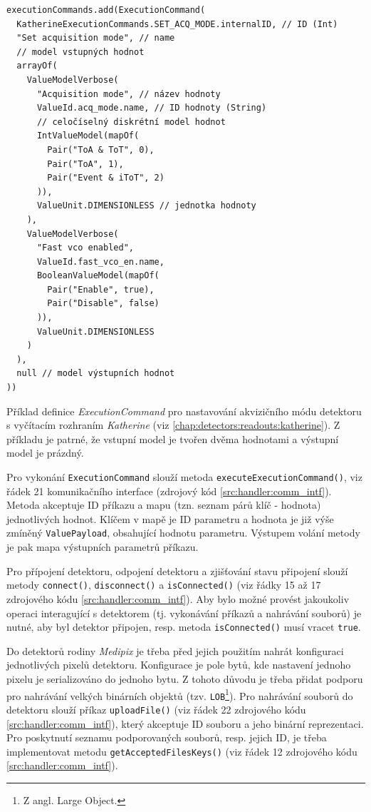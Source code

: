 \begin{verbatim}
executionCommands.add(ExecutionCommand(
  KatherineExecutionCommands.SET_ACQ_MODE.internalID, // ID (Int)
  "Set acquisition mode", // name
  // model vstupných hodnot
  arrayOf(
    ValueModelVerbose(
      "Acquisition mode", // název hodnoty
      ValueId.acq_mode.name, // ID hodnoty (String)
	  // celočíselný diskrétní model hodnot
	  IntValueModel(mapOf(
        Pair("ToA & ToT", 0),
        Pair("ToA", 1),
        Pair("Event & iToT", 2)
      )),
      ValueUnit.DIMENSIONLESS // jednotka hodnoty
    ), 
    ValueModelVerbose(
      "Fast vco enabled",
      ValueId.fast_vco_en.name,
      BooleanValueModel(mapOf(
        Pair("Enable", true),
        Pair("Disable", false)
      )),
      ValueUnit.DIMENSIONLESS
	)
  ),
  null // model výstupních hodnot
))
\end{verbatim}
\begin{code}[h!]
\caption{Příklad definice \textit{ExecutionCommand} pro nastavování akvizičního módu detektoru s vyčítacím rozhraním \textit{Katherine} (viz \ref{chap:detectors:readouts:katherine}). Z příkladu je patrné, že vstupní model je tvořen dvěma hodnotami a výstupní model je prázdný.}
\label{src:handler:execution_command}
\end{code}

Pro vykonání \texttt{ExecutionCommand} slouží metoda \texttt{executeExecutionCommand()}, viz řádek 21 komunikačního interface (zdrojový kód \ref{src:handler:comm_intf}). Metoda akceptuje ID příkazu a mapu (tzn. seznam párů klíč - hodnota) jednotlivých hodnot. Klíčem v mapě je ID parametru a hodnota je již výše zmíněný \texttt{ValuePayload}, obsahující hodnotu parametru. Výstupem volání metody je pak mapa výstupních parametrů příkazu.

Pro přípojení detektoru, odpojení detektoru a zjišťování stavu připojení slouží metody \texttt{connect()}, \texttt{disconnect()} a \texttt{isConnected()} (viz řádky 15 až 17 zdrojového kódu \ref{src:handler:comm_intf}). Aby bylo možné provést jakoukoliv operaci interagující s detektorem (tj. vykonávání příkazů a nahrávání souborů) je nutné, aby byl detektor připojen, resp. metoda \texttt{isConnected()} musí vracet \texttt{true}.

Do detektorů rodiny \textit{Medipix} je třeba před jejich použitím nahrát konfiguraci jednotlivých pixelů detektoru. Konfigurace je pole bytů, kde nastavení jednoho pixelu je serializováno do jednoho bytu. Z tohoto důvodu je třeba přidat podporu pro nahrávání velkých binárních objektů (tzv. \texttt{LOB}\footnote{Z angl. Large Object.}).
Pro nahrávání souborů do detektoru slouží příkaz \texttt{uploadFile()} (viz řádek 22 zdrojového kódu \ref{src:handler:comm_intf}), který akceptuje ID souboru a jeho binární reprezentaci. Pro poskytnutí seznamu podporovaných souborů, resp. jejich ID, je třeba implementovat metodu \texttt{getAcceptedFilesKeys()} (viz řádek 12 zdrojového kódu \ref{src:handler:comm_intf}).

